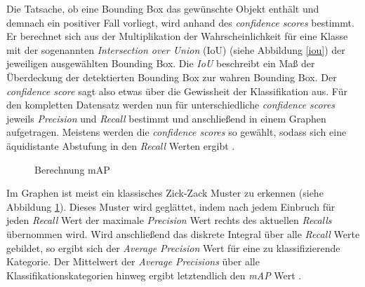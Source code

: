 Die Tatsache, ob eine Bounding Box das gewünschte Objekt enthält und demnach ein positiver Fall vorliegt, wird anhand des \textit{confidence scores} bestimmt. Er berechnet sich aus der Multiplikation der Wahrscheinlichkeit für eine Klasse mit der sogenannten \textit{Intersection over Union} (IoU) (siehe Abbildung \ref{iou}) der jeweiligen ausgewählten Bounding Box. Die \textit{IoU} beschreibt ein Maß der Überdeckung der detektierten Bounding Box zur wahren Bounding Box. Der \textit{confidence score} sagt also etwas über die Gewissheit der Klassifikation aus. Für den kompletten Datensatz werden nun für unterschiedliche \textit{confidence scores} jeweils \textit{Precision} und \textit{Recall} bestimmt und anschließend in einem Graphen aufgetragen. Meistens werden die \textit{confidence scores} so gewählt, sodass sich eine äquidistante Abstufung in den \textit{Recall} Werten ergibt \cite{DingfuZhouJinFangXibinSongChenyeGuanJunboYinYuchaoDaiRuigangYang.2019}. 

\begin{figure}[H]
	\caption[Berechnung mAP]{Berechnung mAP \cite{JonathanHui.20180307}} 
	\label{map}
\end{figure} 

Im Graphen ist meist ein klassisches \glqq Zick-Zack\grqq{} Muster zu erkennen (siehe Abbildung \ref{map}). Dieses Muster wird geglättet, indem nach jedem Einbruch für jeden \textit{Recall} Wert der maximale \textit{Precision} Wert rechts des aktuellen \textit{Recalls} übernommen wird. Wird anschließend das diskrete Integral über alle \textit{Recall} Werte gebildet, so ergibt sich der \textit{Average Precision} Wert für eine zu klassifizierende Kategorie. Der Mittelwert der  \textit{Average Precisions} über alle Klassifikationskategorien hinweg ergibt letztendlich den \textit{mAP} Wert \cite{JonathanHui.20180307}. 
